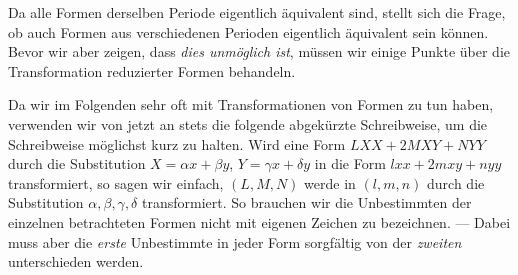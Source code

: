 Da alle Formen derselben Periode eigentlich äquivalent sind, stellt sich die Frage, ob auch Formen aus verschiedenen Perioden eigentlich äquivalent sein können. Bevor wir aber zeigen, dass \textit{dies unmöglich ist}, müssen wir einige Punkte über die Transformation reduzierter Formen behandeln.

Da wir im Folgenden sehr oft mit Transformationen von Formen zu tun haben, verwenden wir von jetzt an stets die folgende abgekürzte Schreibweise, um die Schreibweise möglichst kurz zu halten. Wird eine Form $LXX+2MXY+NYY$ durch die Substitution $X=\alpha x+\beta y$, $Y=\gamma x+\delta y$ in die Form $lxx+2mxy+nyy$ transformiert, so sagen wir einfach, $(L,M,N)$ werde in $(l,m,n)$ durch die Substitution $\alpha,\beta,\gamma,\delta$ transformiert. So brauchen wir die Unbestimmten der einzelnen betrachteten Formen nicht mit eigenen Zeichen zu bezeichnen. --- Dabei muss aber die \textit{erste} Unbestimmte in jeder Form sorgfältig von der \textit{zweiten} unterschieden werden.

